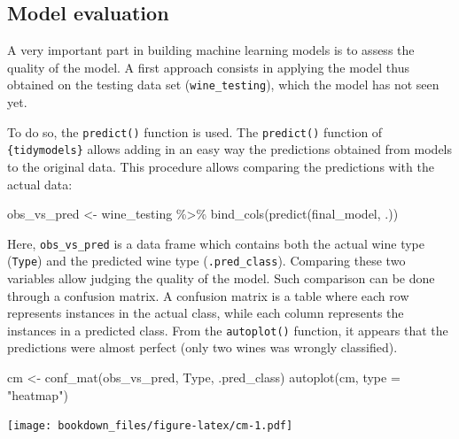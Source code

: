 \documentclass[
]{krantz}
\makeatletter
\newenvironment{Shaded}{\begin{snugshade}}{\end{snugshade}}
\newcommand{\AttributeTok}[1]{\textcolor[rgb]{0.61,0.61,0.61}{#1}}
\newcommand{\FunctionTok}[1]{\textcolor[rgb]{0,0,0}{#1}}
\newcommand{\NormalTok}[1]{#1}
\newcommand{\OtherTok}[1]{\textcolor[rgb]{0.37,0.37,0.37}{#1}}
\newcommand{\SpecialCharTok}[1]{\textcolor[rgb]{0,0,0}{#1}}
\newcommand{\StringTok}[1]{\textcolor[rgb]{0.5,0.5,0.5}{#1}}
\newenvironment{kframe}{%
\medskip{}
\setlength{\fboxsep}{.8em}
 \def\at@end@of@kframe{}%
 \ifinner\ifhmode%
  \def\at@end@of@kframe{\end{minipage}}%
  \begin{minipage}{\columnwidth}%
 \fi\fi%
 \def\FrameCommand##1{\hskip\@totalleftmargin \hskip-\fboxsep
 \colorbox{shadecolor}{##1}\hskip-\fboxsep
     \hskip-\linewidth \hskip-\@totalleftmargin \hskip\columnwidth}%
 \MakeFramed {\advance\hsize-\width
   \@totalleftmargin\z@ \linewidth\hsize
   \@setminipage}}%
 {\par\unskip\endMakeFramed%
 \at@end@of@kframe}
\renewenvironment{Shaded}{\begin{kframe}}{\end{kframe}}
\makeatother
\begin{document}
\hypertarget{model-evaluation}{%
\subsection{Model evaluation}\label{model-evaluation}}

A very important part in building machine learning models is to assess the quality of the model. A first approach consists in applying the model thus obtained on the testing data set (\texttt{wine\_testing}), which the model has not seen yet.

To do so, the \texttt{predict()} function is used. The \texttt{predict()} function of \texttt{\{tidymodels\}} allows adding in an easy way the predictions obtained from models to the original data. This procedure allows comparing the predictions with the actual data:

\begin{Shaded}
\begin{Highlighting}[]
\NormalTok{obs\_vs\_pred }\OtherTok{\textless{}{-}}\NormalTok{ wine\_testing }\SpecialCharTok{\%\textgreater{}\%}
  \FunctionTok{bind\_cols}\NormalTok{(}\FunctionTok{predict}\NormalTok{(final\_model, .))}
\end{Highlighting}
\end{Shaded}

Here, \texttt{obs\_vs\_pred} is a data frame which contains both the actual wine type (\texttt{Type}) and the predicted wine type (\texttt{.pred\_class}). Comparing these two variables allow judging the quality of the model. Such comparison can be done through a confusion matrix. A confusion matrix is a table where each row represents instances in the actual class, while each column represents the instances in a predicted class. From the \texttt{autoplot()} function, it appears that the predictions were almost perfect (only two wines was wrongly classified).

\begin{Shaded}
\begin{Highlighting}[]
\NormalTok{cm }\OtherTok{\textless{}{-}} \FunctionTok{conf\_mat}\NormalTok{(obs\_vs\_pred, Type, .pred\_class)}
\FunctionTok{autoplot}\NormalTok{(cm, }\AttributeTok{type =} \StringTok{"heatmap"}\NormalTok{)}
\end{Highlighting}
\end{Shaded}

\texttt{[image: bookdown\_files/figure-latex/cm-1.pdf]}
\end{document}
